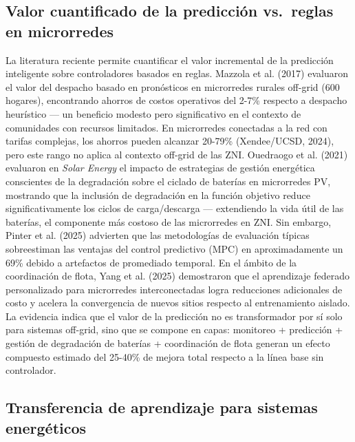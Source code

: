 \documentclass[12pt,letterpaper]{article}
\begin{document}
\subsection*{Valor cuantificado de la predicci\'on vs.\ reglas en microrredes}

La literatura reciente permite cuantificar el valor incremental de la predicci\'on inteligente sobre controladores basados en reglas. Mazzola et al. (2017) evaluaron el valor del despacho basado en pron\'osticos en microrredes rurales off-grid (600 hogares), encontrando ahorros de costos operativos del 2-7\% respecto a despacho heur\'istico --- un beneficio modesto pero significativo en el contexto de comunidades con recursos limitados. En microrredes conectadas a la red con tarifas complejas, los ahorros pueden alcanzar 20-79\% (Xendee/UCSD, 2024), pero este rango no aplica al contexto off-grid de las ZNI. Ouedraogo et al. (2021) evaluaron en \textit{Solar Energy} el impacto de estrategias de gesti\'on energ\'etica conscientes de la degradaci\'on sobre el ciclado de bater\'ias en microrredes PV, mostrando que la inclusi\'on de degradaci\'on en la funci\'on objetivo reduce significativamente los ciclos de carga/descarga --- extendiendo la vida \'util de las bater\'ias, el componente m\'as costoso de las microrredes en ZNI. Sin embargo, Pinter et al. (2025) advierten que las metodolog\'ias de evaluaci\'on t\'ipicas sobreestiman las ventajas del control predictivo (MPC) en aproximadamente un 69\% debido a artefactos de promediado temporal. En el \'ambito de la coordinaci\'on de flota, Yang et al. (2025) demostraron que el aprendizaje federado personalizado para microrredes interconectadas logra reducciones adicionales de costo y acelera la convergencia de nuevos sitios respecto al entrenamiento aislado. La evidencia indica que el valor de la predicci\'on no es transformador por s\'i solo para sistemas off-grid, sino que se compone en capas: monitoreo + predicci\'on + gesti\'on de degradaci\'on de bater\'ias + coordinaci\'on de flota generan un efecto compuesto estimado del 25-40\% de mejora total respecto a la l\'inea base sin controlador.

\subsection*{Transferencia de aprendizaje para sistemas energ\'eticos}
\end{document}
